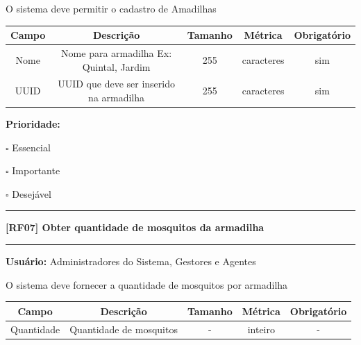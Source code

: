 \documentclass{scrreprt}
\begin{document}
	O sistema deve permitir o cadastro de Amadilhas
	
	\begin{center}
		\begin{adjustbox}{width=\textwidth}      \begin{tabular}{ |c|c|c|c|c| } 
			\hline
			\rowcolor{lightgray} Campo & Descrição & Tamanho & Métrica & Obrigatório \\
			\hline
			Nome & Nome para armadilha Ex: Quintal, Jardim & 255 & caracteres & sim \\ 
			\hline  
			UUID & UUID que deve ser inserido na armadilha & 255 & caracteres & sim \\ 
			\hline  
		\end{tabular}    \end{adjustbox}
	\end{center}
	
	\textbf{Prioridade: }\begin{itemize*}
		\item[\hspace{1cm}\rlap{\raisebox{0.2ex}{\hspace{0.4ex}\scriptsize \ding{56}}}$\square$]
		Essencial
		\item[\hspace{1cm}$\square$]
		Importante
		\item[\hspace{1cm}$\square$]
		Desejável
	\end{itemize*}
	\begin{center}
		\noindent\rule{16cm}{0.4pt}
		\textbf{[RF07] Obter quantidade de mosquitos da armadilha}
		\noindent\rule{16cm}{0.4pt}
	\end{center}
	\textbf{Usuário:} Administradores do Sistema, Gestores e Agentes
	
	O sistema deve fornecer a quantidade de mosquitos por armadilha
	
	\begin{center}
		\begin{adjustbox}{width=\textwidth}      \begin{tabular}{ |c|c|c|c|c| } 
			\hline
			\rowcolor{lightgray} Campo & Descrição & Tamanho & Métrica & Obrigatório \\
			\hline
			Quantidade & Quantidade de mosquitos & - & inteiro & - \\    
			\hline 
		\end{tabular}    \end{adjustbox}
	\end{center}
	
\end{document}
